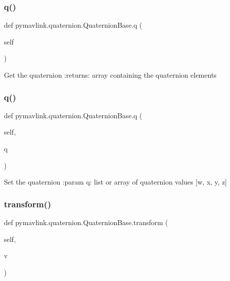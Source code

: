 \subsubsection{\texorpdfstring{q()}{q()}\hspace{0.1cm}{\footnotesize\ttfamily [1/2]}}
{\footnotesize\ttfamily def pymavlink.\+quaternion.\+Quaternion\+Base.\+q (\begin{DoxyParamCaption}\item[{}]{self }\end{DoxyParamCaption})}

\begin{DoxyVerb}Get the quaternion
:returns: array containing the quaternion elements
\end{DoxyVerb}
 \mbox{\label{classpymavlink_1_1quaternion_1_1QuaternionBase_adf7daed709c0f21d0225039830450543}} 
\subsubsection{\texorpdfstring{q()}{q()}\hspace{0.1cm}{\footnotesize\ttfamily [2/2]}}
{\footnotesize\ttfamily def pymavlink.\+quaternion.\+Quaternion\+Base.\+q (\begin{DoxyParamCaption}\item[{}]{self,  }\item[{}]{q }\end{DoxyParamCaption})}

\begin{DoxyVerb}Set the quaternion
:param q: list or array of quaternion values [w, x, y, z]
\end{DoxyVerb}
 \mbox{\label{classpymavlink_1_1quaternion_1_1QuaternionBase_a747068d71180696e5131e2ca31c2a13c}} 
\subsubsection{\texorpdfstring{transform()}{transform()}}
{\footnotesize\ttfamily def pymavlink.\+quaternion.\+Quaternion\+Base.\+transform (\begin{DoxyParamCaption}\item[{}]{self,  }\item[{}]{v }\end{DoxyParamCaption})}

